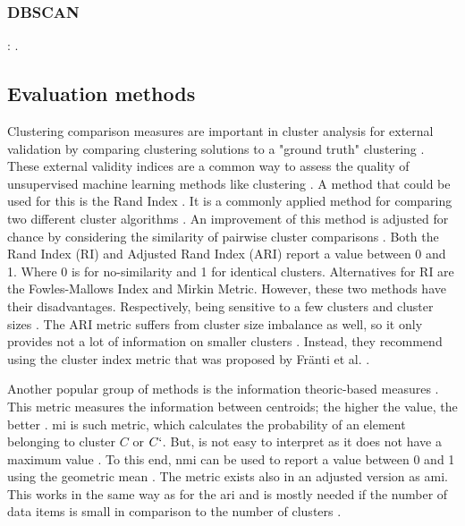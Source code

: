 \subsubsection{DBSCAN}:
\citep{bozdemir_privacy-preserving_nodate}
.

\subsection{Evaluation methods} \label{theory:evaluate}
Clustering comparison measures are important in cluster analysis for external validation by comparing clustering solutions to a "ground truth" clustering \citep{vinh_information_nodate-2}.
These external validity indices are a common way to assess the quality of unsupervised machine learning methods like clustering \citep{warrens_understanding_2022}.
A method that could be used for this is the Rand Index \citep{rand_objective_1971}.
It is a commonly applied method for comparing two different cluster algorithms \citep{wagner_comparing_nodate}.
An improvement of this method is adjusted for chance by considering the similarity of pairwise cluster comparisons \citep{vinh_information_nodate-2}.
Both the Rand Index (RI) and Adjusted Rand Index (ARI) \citep{hubert_comparing_1985-1} report a value between 0 and 1.
Where 0 is for no-similarity and 1 for identical clusters.
Alternatives for RI are the Fowles-Mallows Index and Mirkin Metric.
However, these two methods have their disadvantages. Respectively, being sensitive to a few clusters and cluster sizes \citep{wagner_comparing_nodate}.
The ARI metric suffers from cluster size imbalance as well, so it only provides not a lot of information on smaller clusters \citep{warrens_understanding_2022}.
Instead, they recommend using the cluster index metric that was proposed by Fränti et al. \citep{franti_centroid_2014}.

Another popular group of methods is the information theoric-based measures \citep{vinh_information_nodate-2}.
This metric measures the information between centroids; the higher the value, the better \citep{vinh_information_nodate-2}.
\gls{mi} is such metric, which calculates the probability of an element belonging to cluster $C$ or $C`$.
But, is not easy to interpret as it does not have a maximum value \citep{wagner_comparing_nodate}.
To this end, \gls{nmi} can be used to report a value between 0 and 1 using the geometric mean \citep{strehl_cluster_2002}.
The metric exists also in an adjusted version as \gls{ami}.
This works in the same way as for the \gls{ari} and is mostly needed if the number of data items is small in comparison to the number of clusters \citep{vinh_information_nodate-2}. \newline

